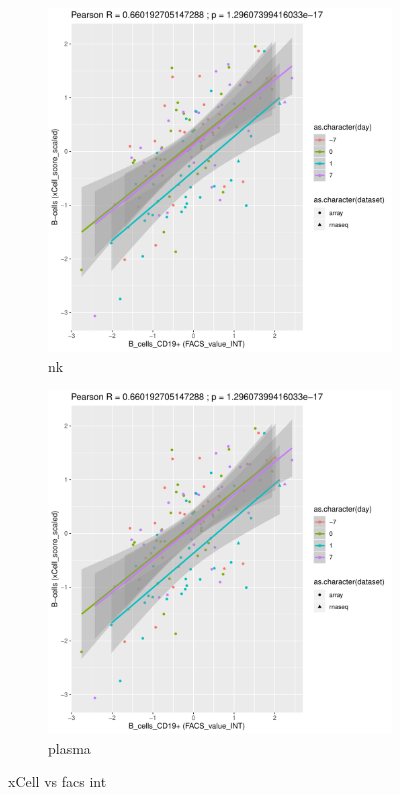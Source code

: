 \begin{figure}
\begin{subfigure}[b]{0.43\textwidth}
        \includegraphics[width=1.0\textwidth,page=3]{mainmatter/figures/chapter_03/validate_xCell_estimates.cell_type_pairs.pdf}
        \caption{nk}
    \end{subfigure}%
    \vspace{1em}\vfill%
    \begin{subfigure}[b]{0.43\textwidth}
        \centering
        \includegraphics[width=1.0\textwidth,page=2]{mainmatter/figures/chapter_03/validate_xCell_estimates.cell_type_pairs.pdf}
        \caption{plasma}
    \end{subfigure}%
    \caption{xCell vs facs int}
    \label{fig:hird_xCell_vs_FACS}
\end{figure}

